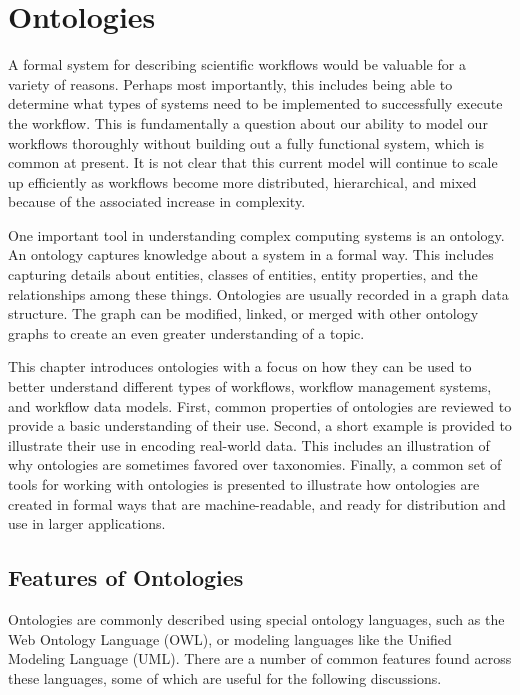 \chapter{Ontologies} \label{ch:ontologies}

A formal system for describing scientific workflows would be valuable for a
variety of reasons. Perhaps most importantly, this includes being able to
determine what types of systems need to be implemented to successfully execute
the workflow. This is fundamentally a question about our ability to model our
workflows thoroughly without building out a fully functional system, which is
common at present. It is not clear that this current model will continue to
scale up efficiently as workflows become more distributed, hierarchical, and
mixed because of the associated increase in complexity. 

One important tool in understanding complex computing systems is an ontology.
An ontology captures knowledge about a system in a formal way. This includes
capturing details about entities, classes of entities, entity properties, and
the relationships among these things. Ontologies are usually recorded in a
graph data structure. The graph can be modified, linked, or merged with other
ontology graphs to create an even greater understanding of a topic.

This chapter introduces ontologies with a focus on how they can be used to
better understand different types of workflows, workflow management systems,
and workflow data models. First, common properties of ontologies are reviewed to
provide a basic understanding of their use. Second, a short example is provided
to illustrate their use in encoding real-world data. This includes an
illustration of why ontologies are sometimes favored over taxonomies. Finally, a
common set of tools for working with ontologies is presented to illustrate how
ontologies are created in formal ways that are machine-readable, and ready for
distribution and use in larger applications.

\section{Features of Ontologies}

Ontologies are commonly described using special ontology languages, such as the
Web Ontology Language (OWL), or modeling languages like the Unified Modeling
Language (UML). There are a number of common features found across these
languages, some of which are useful for the following discussions. 

